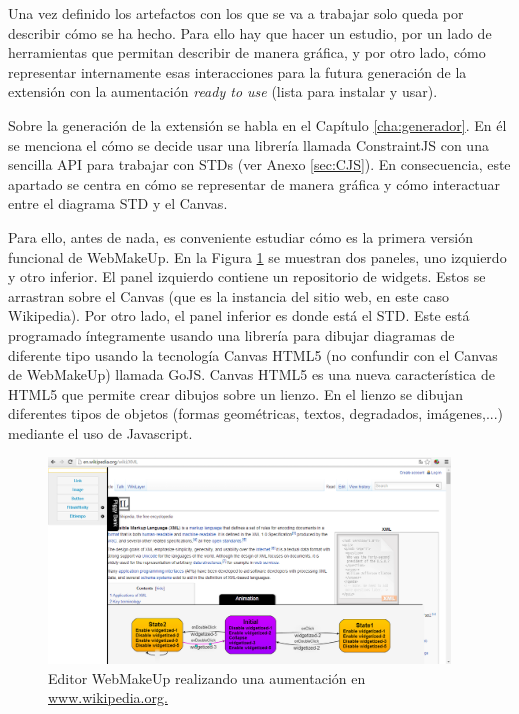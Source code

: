 Una vez definido los artefactos con los que se va a trabajar solo queda por describir cómo se ha hecho. Para ello hay que hacer un estudio, por un lado de herramientas que permitan describir de manera gráfica, y por otro lado, cómo representar internamente esas interacciones para la futura generación de la extensión con la aumentación \emph{ready to use} (lista para instalar y usar).

Sobre la generación de la extensión se habla en el Capítulo \ref{cha:generador}. En él se menciona el cómo se decide usar una librería llamada ConstraintJS con una sencilla API para trabajar con STDs (ver Anexo \ref{sec:CJS}). En consecuencia, este apartado se centra en cómo se representar de manera gráfica y cómo interactuar entre el diagrama STD y el Canvas.

Para ello, antes de nada, es conveniente estudiar cómo es la primera versión funcional de WebMakeUp. En la Figura \ref{fig:WebMakeUpVer1} se muestran dos paneles, uno izquierdo y otro inferior. El panel izquierdo contiene un repositorio de widgets. Estos se arrastran sobre el Canvas (que es la instancia del sitio web, en este caso Wikipedia). Por otro lado, el panel inferior es donde está el STD. Este está programado íntegramente usando una librería para dibujar diagramas de diferente tipo usando la tecnología Canvas HTML5 (no confundir con el Canvas de WebMakeUp) llamada GoJS. Canvas HTML5 es una nueva característica de HTML5 que permite crear dibujos sobre un lienzo. En el lienzo se dibujan diferentes tipos de objetos (formas geométricas, textos, degradados, imágenes,...) mediante el uso de Javascript.

\begin{figure}
\begin{center}
\includegraphics[width=0.95\textwidth]{figs/4-WebMakeUpVer1.png}
\caption{Editor WebMakeUp realizando una aumentación en \url{www.wikipedia.org.}}
\label{fig:WebMakeUpVer1}
\end{center}
\end{figure}

